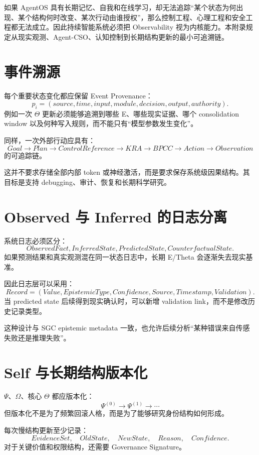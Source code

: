 \begin{chapterlead}
如果 AgentOS 具有长期记忆、自我和在线学习，却无法追踪“某个状态为何出现、某个结构何时改变、某次行动由谁授权”，那么控制工程、心理工程和安全工程都无法成立。因此持续智能系统必须把 Observability 视为内核能力。本附录规定从现实观测、Agent-CSO、认知控制到长期结构更新的最小可追溯链。
\end{chapterlead}

\section{事件溯源}

每个重要状态变化都应保留 Event Provenance：
\[
p_i
=
(
source,
time,
input,
module,
decision,
output,
authority
).
\]
例如一次 $\Theta$ 更新必须能够追溯到哪些 E、哪些现实证据、哪个 consolidation window 以及何种写入规则，而不能只有“模型参数发生变化”。

同样，一次外部行动应具有：
\[
Goal
\rightarrow
Plan
\rightarrow
ControlReference
\rightarrow
KRA
\rightarrow
BPCC
\rightarrow
Action
\rightarrow
Observation
\]
的可追踪链。

这并不要求存储全部内部 token 或神经激活，而是要求保存系统级因果结构。其目标是支持 debugging、审计、恢复和长期科学研究。

\section{Observed 与 Inferred 的日志分离}

系统日志必须区分：
\[
ObservedFact,
InferredState,
PredictedState,
CounterfactualState.
\]
如果预测结果和真实观测混在同一状态日志中，长期 E/Theta 会逐渐失去现实基准。

因此日志层可以采用：
\[
Record=
(
Value,
EpistemicType,
Confidence,
Source,
Timestamp,
Validation
).
\]
当 predicted state 后续得到现实确认时，可以新增 validation link，而不是修改历史记录类型。

这种设计与 SGC epistemic metadata 一致，也允许后续分析“某种错误来自传感失败还是推理失败”。

\section{Self 与长期结构版本化}

$\Psi$、$\Omega$、核心 $\Theta$ 都应版本化：
\[
\Psi^{(0)}
\rightarrow
\Psi^{(1)}
\rightarrow
\cdots
\]
但版本化不是为了频繁回滚人格，而是为了能够研究身份结构如何形成。

每次慢结构更新至少记录：
\[
EvidenceSet,\quad
OldState,\quad
NewState,\quad
Reason,\quad
Confidence.
\]
对于关键价值和权限结构，还需要 Governance Signature。

